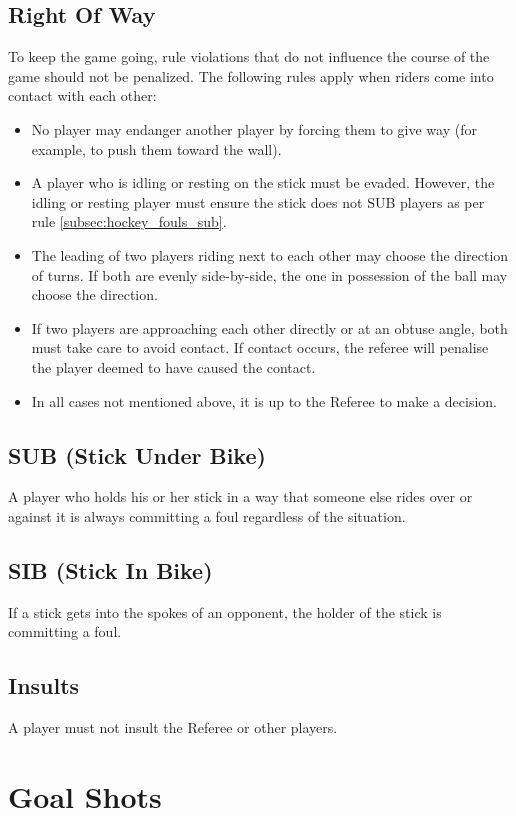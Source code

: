 \subsection{Right Of Way}
To keep the game going, rule violations that do not influence the course of the game should not be penalized.
The following rules apply when riders come into contact with each other:
\begin{itemize}
\item No player may endanger another player by forcing them to give way (for example, to push them toward the wall).
\item A player who is idling or resting on the stick must be evaded.
  However, the idling or resting player must ensure the stick does not SUB players as per rule \ref{subsec:hockey_fouls_sub}.
\item The leading of two players riding next to each other may choose the direction of turns.
If both are evenly side-by-side, the one in possession of the ball may choose the direction.
\item If two players are approaching each other directly or at an obtuse angle, both must take care to avoid contact.
  If contact occurs, the referee will penalise the player deemed to have caused the contact.
\item In all cases not mentioned above, it is up to the Referee to make a decision.
\end{itemize}

\subsection{SUB (Stick Under Bike) \label{subsec:hockey_fouls_sub}}
A player who holds his or her stick in a way that someone else rides over or against it is always committing a foul regardless of the situation.

\subsection{SIB (Stick In Bike)}
If a stick gets into the spokes of an opponent, the holder of the stick is committing a foul.

\subsection{Insults}
A player must not insult the Referee or other players.

\section{Goal Shots}

